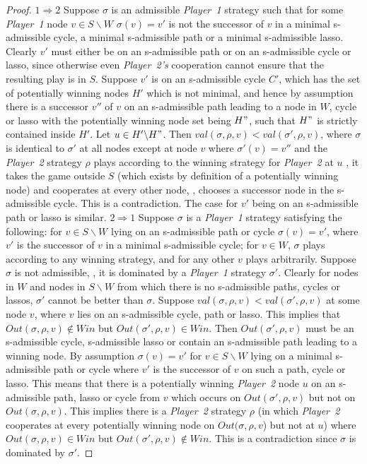 \begin{proof}
	$\mathit{1} \Rightarrow \mathit{2}$
	\newline Suppose $\sigma$ is an admissible \textit{Player~1} strategy such that for some \textit{Player~1} node $v \in S \backslash W$ $\sigma(v) = v'$ is not the successor of $v$ in a minimal s-admissible cycle, a minimal s-admissible path or a minimal s-admissible lasso. Clearly $v'$ must either be on an s-admissible path or on an s-admissible cycle or lasso, since otherwise even \textit{Player~2's} cooperation cannot ensure that the resulting play is in $S$. Suppose $v'$ is on an s-admissible cycle $C'$, which has the set of potentially winning nodes $H'$ which is not minimal, and hence by assumption there is a successor $v''$ of $v$ on an s-admissible path leading to a node in $W$, cycle or lasso with the potentially winning node set being $H"$, such that $H"$ is strictly contained inside $H'$. Let $u \in H' \backslash H"$. Then $val(\sigma,\rho,v) < val(\sigma',\rho,v)$, where $\sigma$ is identical to $\sigma'$ at all nodes except at node $v$ where $\sigma'(v) = v''$ and the \textit{Player~2} strategy $\rho$ plays according to the winning strategy for \textit{Player~2} at $u$ \ie, it takes the game outside $S$ (which exists by definition of a potentially winning node) and cooperates at every other node, \ie, chooses a successor node in the s-admissible cycle. This is a contradiction. The case for $v'$ being on an s-admissible path or lasso is similar. 
	\newline $\mathit{2} \Rightarrow \mathit{1}$
	\newline Suppose $\sigma$ is a \textit{Player~1} strategy satisfying the following: for $v \in S \backslash W$ lying on an s-admissible path or cycle $\sigma(v) = v'$, where $v'$ is the successor of $v$ in a minimal s-admissible cycle; for $v \in W$, $\sigma$ plays according to any winning strategy, and for any other $v$ plays arbitrarily. Suppose $\sigma$ is not admissible, \ie, it is dominated by a \textit{Player~1} strategy $\sigma'$. Clearly for nodes in $W$ and nodes in $S \backslash W$ from which there is no s-admissible paths, cycles or lassos, $\sigma'$ cannot be better than $\sigma$. Suppose $val(\sigma,\rho,v) < val(\sigma',\rho,v)$ at some node $v$, where $v$ lies on an s-admissible cycle, path or lasso. This implies that $Out(\sigma,\rho,v) \notin \mathit{Win}$ but $Out(\sigma',\rho,v) \in \mathit{Win}$.
	Then $Out(\sigma',\rho,v)$ must be an s-admissible cycle, s-admissible lasso or contain an s-admissible path leading to a winning node. By assumption $\sigma(v) = v'$ for $v \in S \backslash W$ lying on a minimal s-admissible path or cycle where $v'$ is the successor of $v$ on such a path, cycle or lasso. This means that there is a potentially winning \textit{Player~2} node $u$ on an s-admissible path, lasso or cycle from $v$ which occurs on $Out(\sigma',\rho,v)$ but not on $Out(\sigma,\rho,v)$. This implies there is a \textit{Player~2} strategy $\rho$ (in which \textit{Player~2} cooperates at every potentially winning node on $Out(\sigma,\rho,v$) but not at $u$) where $Out(\sigma,\rho,v) \in \mathit{Win}$ but $Out(\sigma',\rho,v) \notin \mathit{Win}$. This is a contradiction since $\sigma$ is dominated by $\sigma'$. 
\end{proof}


